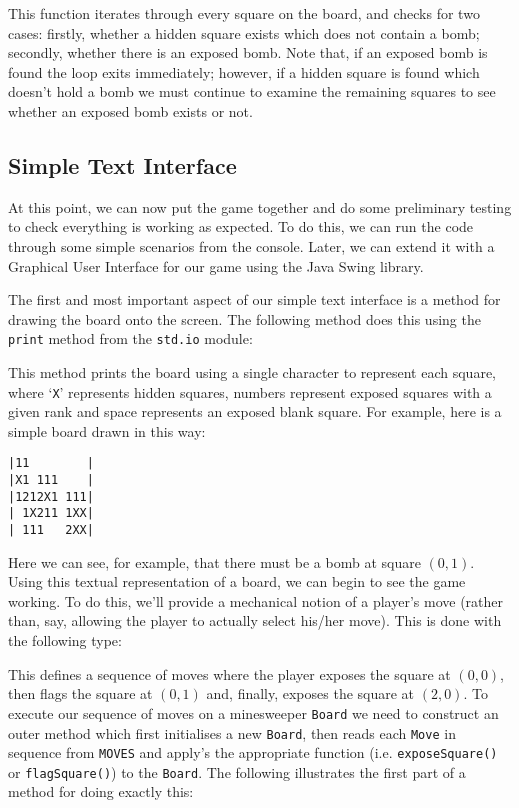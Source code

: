 This function iterates through every square on the board, and checks for two cases: firstly, whether a hidden square exists which does not contain a bomb; secondly, whether there is an exposed bomb.  Note that, if an exposed bomb is found the loop exits immediately; however, if a hidden square is found which doesn't hold a bomb we must continue to examine the remaining squares to see whether an exposed bomb exists or not.

\subsection{Simple Text Interface}
At this point, we can now put the game together and do some preliminary testing to check everything is working as expected.  To do this, we can run the code through some simple scenarios from the console.  Later, we can extend it with a Graphical User Interface for our game using the Java Swing library. 

The first and most important aspect of our simple text interface is a method for drawing the board onto the screen.  The following method does this using the \lstinline{print} method from the \lstinline{std.io} module:



This method prints the board using a single character to represent each square, where `\verb+X+' represents hidden squares, numbers represent exposed squares with a given rank and space represents an exposed blank square.  For example, here is a simple board drawn in this way:
\begin{lstlisting}
|11        |
|X1 111    |
|1212X1 111|
| 1X211 1XX|
| 111   2XX|
\end{lstlisting}
Here we can see, for example, that there must be a bomb at square $(0,1)$.  Using this textual representation of a board, we can begin to see the game working.  To do this, we'll provide a mechanical notion of a player's move (rather than, say, allowing the player to actually select his/her move).  This is done with the following type:



This defines a sequence of moves where the player exposes the square at $(0,0)$, then flags the square at $(0,1)$ and, finally, exposes the square at $(2,0)$.  To execute our sequence of moves on a minesweeper \lstinline{Board} we need to construct an outer method which first initialises a new \lstinline{Board}, then reads each \lstinline{Move} in sequence from \lstinline{MOVES} and apply's the appropriate function (i.e. \lstinline{exposeSquare()} or \lstinline{flagSquare()}) to the \lstinline{Board}.  The following illustrates the first part of a method for doing exactly this:

